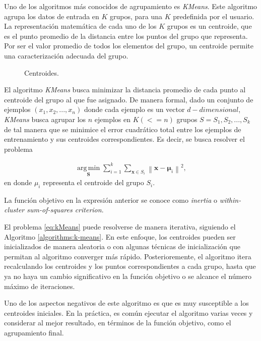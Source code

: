 Uno de los algoritmos más conocidos de agrupamiento es \textit{KMeans}. Este algoritmo agrupa los datos de entrada en $K$ grupos, para una $K$ predefinida por el usuario. La representación matemática de cada uno de los $K$ grupos es un centroide, que es el punto promedio de la distancia entre los puntos del grupo que representa. Por ser el valor promedio de todos los elementos del grupo, un centroide permite una caracterización adecuada del grupo. 

 \begin{figure}[htbp]
   \centering
   
    \caption{Centroides.}
    \label{fig:centroides}
\end{figure}

El algoritmo \textit{KMeans} busca minimizar la distancia promedio de cada punto al centroide del grupo al que fue asignado. De manera formal, dado un conjunto de ejemplos $(x_1, x_2, ..., x_n)$ donde cada ejemplo es un vector $d-dimensional$, \textit{KMeans} busca agrupar los $n$ ejemplos en $K(<=n)$ grupos $S = {S_1, S_2, ..., S_k}$ de tal manera que se minimice el error cuadrático total entre los ejemplos de entrenamiento y sus centroides correspondientes. Es decir, se busca resolver el problema 

\begin{align} \label{eq:kMeans}
\displaystyle {\underset {\mathbf {S} }{\operatorname {arg\,min} }}\sum _{i=1}^{k}\sum _{\mathbf {x} \in S_{i}}\left\|\mathbf {x} -{\boldsymbol {\mu }}_{i}\right\|^{2},
\end{align}
en donde $\mu_i$ representa el centroide del grupo $S_i$. 

La función objetivo en la expresión anterior se conoce como \textit{inertia} o \textit{within-cluster sum-of-squares criterion}.

El problema \ref{eq:kMeans} puede resolverse de manera iterativa, siguiendo el Algoritmo \ref{algorithms:k-means}. En este enfoque, los centroides pueden ser inicializados de manera aleatoria o con algunas técnicas de inicialización que permitan al algoritmo converger más rápido. Posterioremente, el algoritmo itera recalculando los centroides y los puntos correspondientes a cada grupo, hasta que ya no haya un cambio significativo en la función objetivo o se alcance el número máximo de iteraciones. 

Uno de los aspectos negativos de este algoritmo es que es muy susceptible a los centroides iniciales. En la práctica, es común ejecutar el algoritmo varias veces y considerar al mejor resultado, en términos de la función objetivo, como el agrupamiento final.

